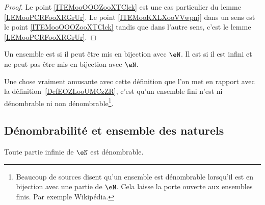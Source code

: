 \begin{proof}
	Le point \ref{ITEMooOOOZooXTClck} est une cas particulier du lemme \ref{LEMooPCRFooXRGrUr}. Le point \ref{ITEMooKXLXooVVwpnj} dans un sens est le point \ref{ITEMooOOOZooXTClck} tandis que dans l'autre sens, c'est le lemme \ref{LEMooPCRFooXRGrUr}.
\end{proof}


\begin{definition}\label{DefEnsembleDenombrable}
	Un ensemble est  si il peut être mis en bijection avec \( \eN\). Il est  si il est infini et ne peut pas être mis en bijection avec \( \eN\).
\end{definition}
Une chose vraiment amusante avec cette définition que l'on met en rapport avec la définition~\ref{DefEOZLooUMCzZR}, c'est qu'un ensemble fini n'est ni dénombrable ni non dénombrable\footnote{Beaucoup de sources disent qu'un ensemble est dénombrable lorsqu'il est en bijection avec une partie de \( \eN\). Cela laisse la porte ouverte aux ensembles finis. Par exemple Wikipédia\cite{ooLMVKooUiQUtb}.}.



\subsection{Dénombrabilité et ensemble des naturels}

\begin{proposition}      \label{PROPooOBKMooWEGCvM}
	Toute partie infinie de \( \eN\) est dénombrable.
\end{proposition}

